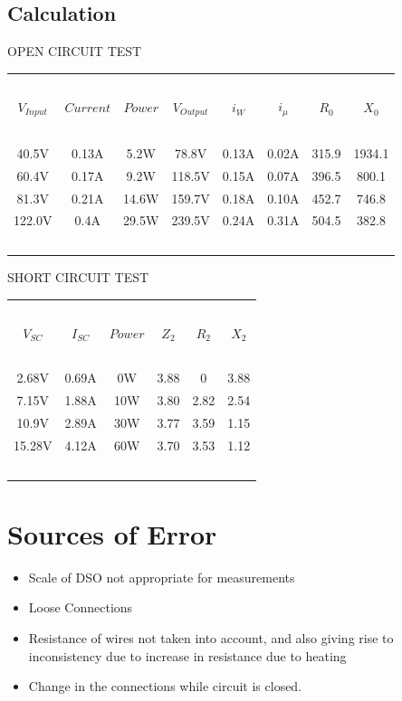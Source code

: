 \documentclass{article}
\begin{document}
\subsection{Calculation}
\begin{center}
OPEN CIRCUIT TEST \\
\vspace{10px}
\begin{tabular}{| c | c | c | c | c | c| c| c|} 
 \hline
    \ & \ & \ & \ & \ & \ & \ & \ \\
    $V_{Input}$ & $Current$ & $Power$ & $V_{Output}$ & $i_W$ & $i_\mu$ & $R_0$ & $X_0$\\ [1em]
    \hline
    \ & \ & \ & \ & \ & \ & \ & \ \\
    40.5V & 0.13A & 5.2W & 78.8V & 0.13A & 0.02A & 315.9 & 1934.1\\
    60.4V & 0.17A & 9.2W & 118.5V & 0.15A & 0.07A & 396.5 & 800.1\\
    81.3V & 0.21A & 14.6W & 159.7V & 0.18A & 0.10A & 452.7 & 746.8\\
    122.0V & 0.4A & 29.5W & 239.5V & 0.24A & 0.31A & 504.5 & 382.8\\
    \ & \ & \ & \ & \ & \ & \ & \ \\
 \hline
\end{tabular}
\end{center}
\vspace{10px}
\begin{center}
SHORT CIRCUIT TEST \\

\vspace{10px}
\begin{tabular}{| c | c | c | c | c | c|} 
 \hline
    \ & \ & \ & \ & \ & \ \\
    $V_{SC}$ & $I_{SC}$ & $Power$ & $Z_2$ & $R_2$ & $X_2$ \\ [1em]
    \hline
    \ & \ & \ & \ & \ & \ \\
    2.68V & 0.69A & 0W & 3.88 & 0 & 3.88 \\
    7.15V & 1.88A & 10W & 3.80 & 2.82 & 2.54\\
    10.9V & 2.89A & 30W & 3.77 & 3.59 & 1.15\\
    15.28V & 4.12A & 60W & 3.70 & 3.53 & 1.12\\
    \ & \ & \ & \ & \ & \ \\
 \hline
\end{tabular}
\end{center}
\vspace{10px}
\section{Sources of Error}
\begin{itemize}
\item Scale of DSO not appropriate for measurements
\item Loose Connections
\item Resistance of wires not taken into account, and also giving rise to inconsistency due to increase in resistance due to heating
\item Change in the connections while circuit is closed.

\end{itemize}
\end{document}
